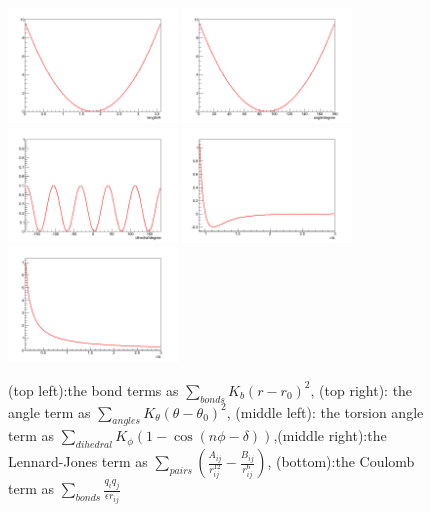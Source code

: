 \begin{figure} 
\begin{center} 
\includegraphics[width=0.4\textwidth]{bond.png}
\includegraphics[width=0.4\textwidth]{angle.png}
\includegraphics[width=0.4\textwidth]{dihedral.png}
\includegraphics[width=0.4\textwidth]{pair.png}
\includegraphics[width=0.4\textwidth]{pair2.png}
\end{center}  
\caption{ (top left):the bond terms as $\sum_{bonds} K_b(r-r_0)^2$, (top right): the angle term as $\sum_{angles} K_{\theta}(\theta-\theta_0)^2$,
(middle left): the torsion angle term as $\sum_{dihedral} K_{\phi}(1-\cos(n\phi-\delta))$,(middle right):the Lennard-Jones term as $\sum_{pairs} (\frac{A_{ij}}{r^{12}_{ij}}-\frac{B_{ij}}{r^{6}_{ij}})$,
(bottom):the Coulomb term as $\sum_{bonds} \frac{q_iq_j}{\epsilon r_{ij}}$}
\label{fig:energy}
\end{figure} 


